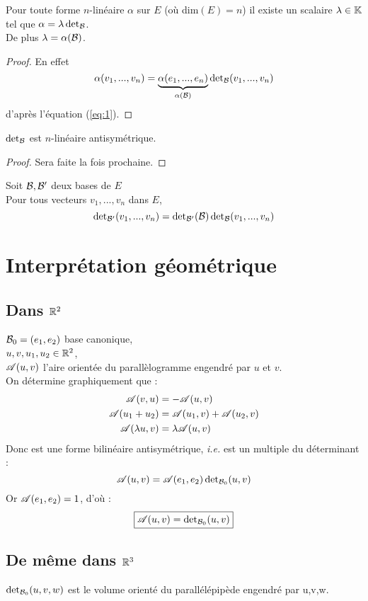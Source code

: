 \documentclass[12pt,a4paper,final]{article}
\begin{document}
	\begin{prop}
		Pour toute forme $n$-lin\'eaire $\alpha$ sur $E$ (o\`u dim$(E) = n$)
		il existe un scalaire $\lambda \in \mathbb{K}$ tel que $\alpha=\lambda\operatorname{det}_{\mathcal{B}}$. \\
		De plus $\lambda=\alpha(\mathcal{B})$.
	\end{prop}
	\begin{proof}
		En effet
		\[ \alpha(v_1, ..., v_n) = \underbrace{\alpha(e_1, ..., e_n)}_{\alpha(\mathcal{B})}\operatorname{det}_{\mathcal{B}}(v_1, ..., v_n) \]
		d'apr\`es l'\'equation (\ref{eq:1}).
	\end{proof}
	\begin{prop}
		$\operatorname{det}_{\mathcal{B}}$ est $n$-lin\'eaire antisym\'etrique.
	\end{prop}
	\begin{proof}
		Sera faite la fois prochaine.
	\end{proof}
	\begin{prop}
		Soit $\mathcal{B}, \mathcal{B}'$ deux bases de $E$\\
		Pour tous vecteurs $v_1, ..., v_n$ dans $E$,
		\[ \operatorname{det}_{\mathcal{B}'}(v_1, ..., v_n) = \operatorname{det}_{\mathcal{B}'}(\mathcal{B}) \operatorname{det}_{\mathcal{B}}(v_1, ..., v_n)\]
	\end{prop}
	\section*{Interpr\'etation g\'eom\'etrique}
		\subsection*{Dans $\mathbb{R}^2$}
			\noindent
			$\mathcal{B}_0 = (e_1, e_2)$ base canonique, \\
			$u,v,u_1,u_2 \in \mathbb{R}^2$, \\
			$\mathscr{A}(u, v)$ l'aire orient\'ee du parall\`elogramme engendr\'e par $u$ et $v$. \\
			On d\'etermine graphiquement que :
			\begin{align*}
				\mathscr{A}(v,u)				&= -\mathscr{A}(u,v) \\
				\mathscr{A}(u_1+u_2)			&= \mathscr{A}(u_1,v)+\mathscr{A}(u_2,v) \\
				\mathscr{A}(\lambda u, v)	&= \lambda\mathscr{A}(u,v)
			\end{align*}
			Donc \A est une forme bilin\'eaire antisym\'etrique, \textit{i.e.} est un multiple du d\'eterminant :
			\[ \mathscr{A}(u,v) = \mathscr{A}(e_1,e_2)\operatorname{det}_{\mathcal{B}_0}(u,v) \]
			Or $\mathscr{A}(e_1, e_2)=1$, d'o\`u :
			\[\boxed{
				\mathscr{A}(u,v) = \operatorname{det}_{\mathcal{B}_0}(u,v)
			}\]
		\subsection*{De m\^eme dans $\mathbb{R}^3$}
			$\operatorname{det}_{\mathcal{B}_0}(u,v,w)$ est le volume orient\'e du parall\'el\'epip\`ede engendr\'e par u,v,w.
\end{document}
